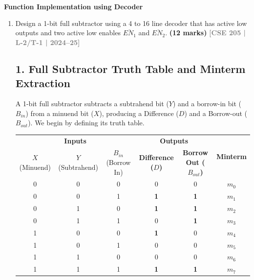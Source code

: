 \documentclass[12pt,a3paper]{article}
\newcommand{\yr}[1]{\hfill\textcolor{gray}{\small\textbf{[#1]}}}
\newcommand{\mk}[1]{\textcolor{orange!70!black}{\small\textbf{(#1 marks)}}}
\newcommand{\subtopic}[2]{%
  \vspace{10pt}
  \noindent\begin{tcolorbox}[colback=#1!8,colframe=#1,boxrule=0.6pt,arc=4pt,
    left=6pt,right=6pt,top=4pt,bottom=4pt]
    \small\bfseries\textcolor{#1}{#2}
  \end{tcolorbox}
  \vspace{2pt}
}
\begin{document}
\subtopic{cD}{Function Implementation using Decoder}
\label{sub:s4-decoder-func}

\begin{enumerate}

\item Design a 1-bit full subtractor using a 4 to 16 line decoder that has active low outputs and two active low enables $\overline{EN_1}$ and $\overline{EN_2}$.
\mk{12} \yr{CSE 205 | L-2/T-1 | 2024--25}

\begin{tcolorbox}[enhanced,breakable,ansbox,colback=cD!4,colframe=cD,boxrule=0.8pt,arc=5pt,title={\textbf{Answer}},fonttitle=\bfseries\color{white},colbacktitle=cD]

\subsection*{1. Full Subtractor Truth Table and Minterm Extraction}

A 1-bit full subtractor subtracts a subtrahend bit ($Y$) and a borrow-in bit ($B_{in}$) from a minuend bit ($X$), producing a Difference ($D$) and a Borrow-out ($B_{out}$). We begin by defining its truth table.

\begin{center}
\renewcommand{\arraystretch}{1.2}
\begin{tabular}{ccc|cc|c}
\toprule
\multicolumn{3}{c|}{\textbf{Inputs}} & \multicolumn{2}{c|}{\textbf{Outputs}} & \multirow{2}{*}{\textbf{Minterm}} \\
$X$ (Minuend) & $Y$ (Subtrahend) & $B_{in}$ (Borrow In) & \textbf{Difference ($D$)} & \textbf{Borrow Out ($B_{out}$)} & \\
\midrule
0 & 0 & 0 & 0 & 0 & $m_0$ \\
0 & 0 & 1 & \textcolor{cD}{\textbf{1}} & \textcolor{cD}{\textbf{1}} & \textcolor{cD}{\textbf{$m_1$}} \\
0 & 1 & 0 & \textcolor{cD}{\textbf{1}} & \textcolor{cD}{\textbf{1}} & \textcolor{cD}{\textbf{$m_2$}} \\
0 & 1 & 1 & 0 & \textcolor{cD}{\textbf{1}} & \textcolor{cD}{\textbf{$m_3$}} \\
1 & 0 & 0 & \textcolor{cD}{\textbf{1}} & 0 & \textcolor{cD}{\textbf{$m_4$}} \\
1 & 0 & 1 & 0 & 0 & $m_5$ \\
1 & 1 & 0 & 0 & 0 & $m_6$ \\
1 & 1 & 1 & \textcolor{cD}{\textbf{1}} & \textcolor{cD}{\textbf{1}} & \textcolor{cD}{\textbf{$m_7$}} \\
\bottomrule
\end{tabular}
\end{center}


\end{tcolorbox}
\end{enumerate}
\end{document}
